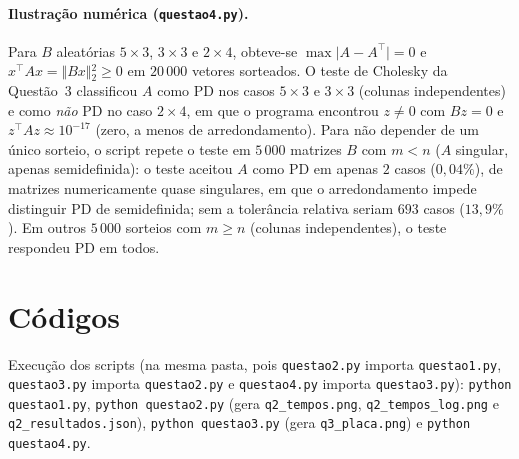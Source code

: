 \documentclass{article}
\newcommand{\T}{^{\top}}
\theoremstyle{remark}
\begin{document}
\paragraph{Ilustração numérica (\texttt{questao4.py}).} Para $B$ aleatórias $5\times3$, $3\times3$ e $2\times4$,
obteve-se $\max\vert{}A-A\T\vert{}=0$ e $x\T Ax=\Vert{}Bx\Vert{}_2^2\ge0$ em $20\,000$ vetores sorteados. O teste de Cholesky da Questão~3
classificou $A$ como PD nos casos $5\times3$ e $3\times3$ (colunas independentes) e como \emph{não} PD no caso $2\times4$,
em que o programa encontrou $z\neq0$ com $Bz=0$ e $z\T Az\approx 10^{-17}$ (zero, a menos de arredondamento).
Para não depender de um único sorteio, o script repete o teste em $5\,000$ matrizes $B$ com $m<n$ ($A$ singular, apenas semidefinida):
o teste aceitou $A$ como PD em apenas $2$ casos ($0{,}04\%$), de matrizes numericamente quase singulares, em que o arredondamento impede
distinguir PD de semidefinida; sem a tolerância relativa seriam $693$ casos ($13{,}9\%$). Em outros $5\,000$ sorteios com $m\ge n$
(colunas independentes), o teste respondeu PD em todos.

\appendix
\section{Códigos}
\begin{sloppypar}
Execução dos scripts (na mesma pasta, pois \texttt{questao2.py} importa \texttt{questao1.py}, \texttt{questao3.py} importa
\texttt{questao2.py} e \texttt{questao4.py} importa \texttt{questao3.py}): \texttt{python questao1.py},
\texttt{python questao2.py} (gera \texttt{q2\_tempos.png}, \texttt{q2\_tempos\_log.png} e \texttt{q2\_resultados.json}),
\texttt{python questao3.py} (gera \texttt{q3\_placa.png}) e \texttt{python questao4.py}.
\end{sloppypar}
\end{document}
